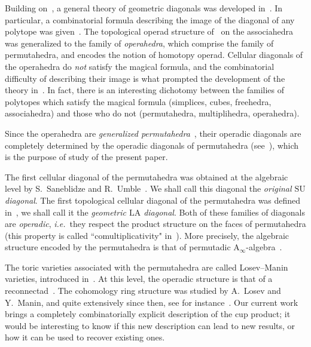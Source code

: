 \documentclass{amsart}
\theoremstyle{definition}
\newcommand{\ie}{\textit{i.e.}~} %
\newcommand{\SU}{\mathrm{SU}}
\newcommand{\LA}{\mathrm{LA}}
\newcommand{\Ainf}{\ensuremath{\mathrm{A}_\infty}}
\begin{document}
Building on~\cite{MasudaThomasTonksVallette}, a general theory of geometric diagonals was developed in~\cite{LaplanteAnfossi}.
In particular, a combinatorial formula describing the image of the diagonal of any polytope was given~\cite[Thm.~1.26]{LaplanteAnfossi}.
The topological operad structure of~\cite{MasudaThomasTonksVallette} on the associahedra was generalized to the family of \emph{operahedra}, which comprise the family of permutahedra, and encodes the notion of homotopy operad.
Cellular diagonals of the operahedra do \emph{not} satisfy the magical formula, and the combinatorial difficulty of describing their image is what prompted the development of the theory in~\cite{LaplanteAnfossi}.
In fact, there is an interesting dichotomy between the families of polytopes which satisfy the magical formula (simplices, cubes, freehedra, associahedra) and those who do not (permutahedra, multiplihedra, operahedra).

Since the operahedra are \emph{generalized permutahedra}~\cite{Postnikov}, their operadic diagonals are completely determined by the operadic diagonals of permutahedra (see~\cite[Sect.~1.6]{LaplanteAnfossi}), which is the purpose of study of the present paper.

The first cellular diagonal of the permutahedra was obtained at the algebraic level by S.~Sanebli\-dze and R.~Umble~\cite{SaneblidzeUmble}.
We shall call this diagonal the \emph{original $\SU$ diagonal}. 
The first topological cellular diagonal of the permutahedra was defined in~\cite{LaplanteAnfossi}, we shall call it the \emph{geometric $\LA$ diagonal}.
Both of these families of diagonals are \emph{operadic}, \ie they respect the product structure on the faces of permutahedra (this property is called ``comultiplicativity" in~\cite{SaneblidzeUmble}).
More precisely, the algebraic structure encoded by the permutahedra is that of permutadic $\Ainf$-algebra~\cite{LodayRonco-permutads,Markl}.

The toric varieties associated with the permutahedra are called Losev--Manin varieties, introduced in~\cite{LosevManin}.
At this level, the operadic structure is that of a reconnectad~\cite{DotsenkoKeilthyLyskov}. 
The cohomology ring structure was studied by A.~Losev and Y.~Manin, and quite extensively since then, see for instance~\cite{BergstromMinabe, Lin}. 
Our current work brings a completely combinatorially explicit description of the cup product; it would be interesting to know if this new description can lead to new results, or how it can be used to recover existing ones.
\end{document}
